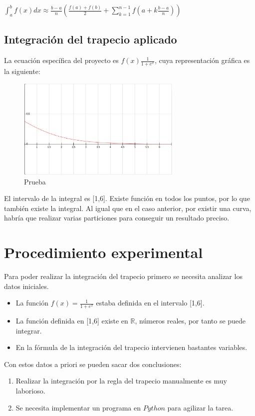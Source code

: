 \documentclass{article}
\begin{document}
      \begin{center}
        $\int_{a}^{b}f(x)dx \approx \frac{b-a}{n}(\frac{f(a)+f(b)}{2}+\sum\limits_{k=1}^{n-1}f(a+k\frac{b-a}{n}))$
      \end{center}

    \subsection{Integración del trapecio aplicado}
      
    La ecuación específica del proyecto es $f(x)\frac{1}{1+e^x}$, cuya representación gráfica es la siguiente:
     
     \begin{figure}[h]
      \begin{center}
         \includegraphics[width=0.7\textwidth]{img4.eps}\caption{Prueba}\label{fig:grafica}
      \end{center}
     \end{figure}

      El intervalo de la integral es [1,6]. Existe función en todos los puntos, por lo que también existe la integral. Al igual que en el caso anterior, por existir una curva, habría que realizar varias particiones para conseguir un resultado preciso.

   \pagebreak


   \section{Procedimiento experimental}
   Para poder realizar la integración del trapecio primero se necesita analizar los datos iniciales.
   \begin{itemize}
    \item La función $f(x)=\frac{1}{1+e^x}$ estaba definida en el intervalo [1,6].
    \item La función definida en [1,6] existe en $\mathbb{R}$, números reales, por tanto se puede integrar.
    \item En la fórmula de la integración del trapecio intervienen bastantes variables.
   \end{itemize}
   Con estos datos a priori se pueden sacar dos conclusiones:
     \begin{enumerate}
       \item Realizar la integración por la regla del trapecio manualmente es muy laborioso.
       \item Se necesita implementar un programa en $Python$ para agilizar la tarea.
     \end{enumerate}
\end{document}
